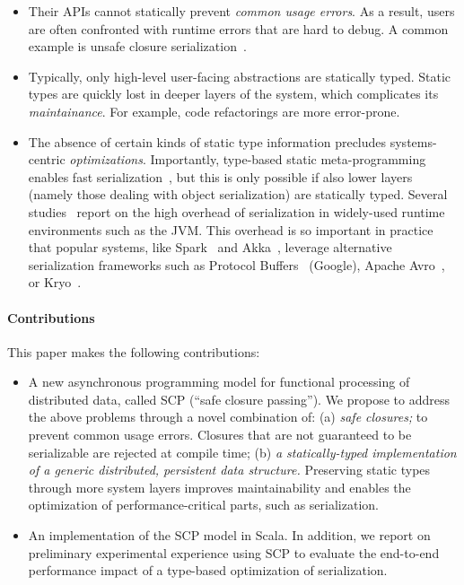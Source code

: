 \documentclass{easychair}
\begin{document}
\begin{itemize}

\item Their APIs cannot statically prevent \emph{common usage errors}. As a result, users are often
      confronted with runtime errors that are hard to debug. A common example is
      unsafe closure serialization~\cite{MillerHO14}.

\item Typically, only high-level user-facing abstractions are statically
      typed. Static types are quickly lost in deeper layers of the system,
      which complicates its \emph{maintainance}. For example, code refactorings
      are more error-prone.


\item The absence of certain kinds of static type information precludes systems-centric \emph{optimizations}.
      Importantly, type-based static meta-programming enables fast serialization~\cite{MillerHBO13}, but this is
      only possible if also lower layers (namely those dealing with object serialization) are statically typed.
      Several studies~\cite{Carpenter1999,Maassen1999,Philippsen2000,Welsh2000} report on the high
      overhead of serialization in widely-used runtime environments such as the JVM. This overhead is so
      important in practice that popular systems, like Spark~\cite{Zaharia2012} and Akka~\cite{Akka},
      leverage alternative serialization frameworks such as Protocol Buffers~\cite{Protobuf} (Google),
      Apache Avro~\cite{Avro}, or Kryo~\cite{Kryo}.

\end{itemize}

\paragraph{Contributions}

This paper makes the following contributions:
\begin{itemize}

\item A new asynchronous programming model for functional processing of distributed
      data, called SCP (``safe closure passing''). We propose to address the above problems through
      a novel combination of: (a) \emph{safe closures;} to prevent common usage errors.
      Closures that are not guaranteed to be serializable are rejected at compile time;
      (b) \emph{a statically-typed implementation of a generic distributed, persistent
      data structure.} Preserving static types through more system layers improves
      maintainability and enables the optimization of performance-critical parts, such as serialization.

\item An implementation of the SCP model in Scala. In addition, we report on preliminary
      experimental experience using SCP to evaluate the end-to-end performance impact of
      a type-based optimization of serialization.

\end{itemize}
\end{document}

